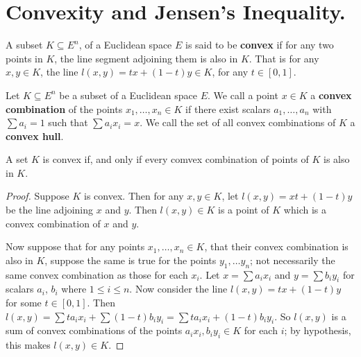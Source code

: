 
\section{Convexity and Jensen's Inequality.}

\begin{definition}
    A subset $K \subseteq E^n$, of a Euclidean space $E$ is said to be
    \textbf{convex} if for any two points in $K$, the line segment adjoining
    them is also in  $K$. That is for any  $x,y \in K$, the line
    $l(x,y)=tx+(1-t)y \in K$, for any $t \in [0,1]$.
\end{definition}

\begin{definition}
    Let $K \subseteq E^n$ be a subset of a Euclidean space $E$. We call a point
    $x \in K$ a \textbf{convex combination} of the points $x_1, \dots, x_n \in
    K$ if there exist scalars $a_1, \dots, a_n$ with $\sum{a_i}=1$ such that
    $\sum{a_ix_i}=x$. We call the set of all convex combinations of $K$ a
    \textbf{convex hull}.
\end{definition}

\begin{lemma}\label{1.2.1}
    A set $K$ is convex if, and only if every comvex combination of points of
    $K$ is also in  $K$.
\end{lemma}
\begin{proof}
    Suppose $K$ is convex. Then for any  $x,y \in K$, let $l(x,y)=xt+(1-t)y$ be
    the line adjoining $x$ and  $y$. Then  $l(x,y) \in K$ is a point of $K$
    which is a convex combination of  $x$ and  $y$.

    Now suppose that for any points  $x_1, \dots ,x_n \in K$, that their convex
    combination is also in $K$, suppose the same is true for the points $y_1,
    \dots y_n$; not necessarily the same convex combination as those for each
    $x_i$. Let $x=\sum{a_ix_i}$ and $y=\sum{b_iy_i}$ for scalars $a_i$,  $b_i$
    where  $1 \leq i \leq n$. Now consider the line  $l(x,y)=tx+(1-t)y$ for some
    $t \in [0,1]$. Then
    $l(x,y)=\sum{ta_ix_i}+\sum{(1-t)b_iy_i}=\sum{ta_ix_i+(1-t)b_iy_i}$. So
    $l(x,y)$ is a sum of convex combinations of the points $a_ix_i,b_iy_i \in K$
    for each  $i$; by hypothesis, this makes  $l(x,y) \in K$.
\end{proof}

